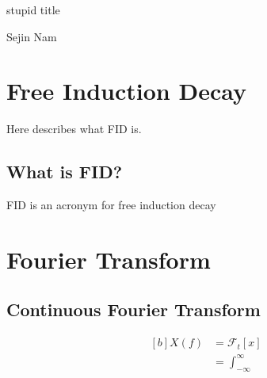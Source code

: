\documentclass[letterpaper, 11pt]{article}
\newcommand{\fourier}[2]{\mathcal{F}_{#1}[#2]}
\numberwithin{equation}{section}
\begin{document}
\begin{titlepage}
	\begin{center}
		stupid title\\
		[10cm]
	\end{center}

	\begin{flushright}
		Sejin Nam
	\end{flushright}
\end{titlepage}

\tableofcontents
\clearpage

\section{Free Induction Decay}
Here describes what FID is. \lipsum[1]
\subsection{What is FID?}
FID is an acronym for free induction decay

\section{Fourier Transform}
\lipsum[2]
\subsection{Continuous Fourier Transform}
\begin{equation}
	\begin{aligned}[b]
		X(f)	&= \fourier{t}{x}\\
			&= \int_{-\infty}^{\infty}
	\end{aligned}
\end{equation}
\end{document}
